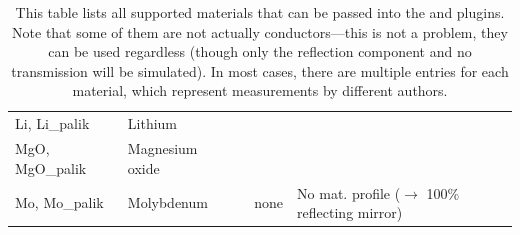 \begin{table}[hb!]
\begin{tabular}{>{\ttfamily}llp{1mm}>{\ttfamily}ll}
Li, Li\_palik         & Lithium &&                     \\
MgO, MgO\_palik       & Magnesium oxide &&             \\
Mo, Mo\_palik         & Molybdenum &&                  none & No mat. profile ($\to$ 100\% reflecting mirror)\\
\bottomrule
\end{tabular}
\caption{
    \label{tbl:conductor-iors}
     This table lists all supported materials that can be passed into the
      and  plugins. Note that
     some of them are not actually conductors---this is not a problem,
     they can be used regardless (though only the reflection component and
     no transmission will be simulated). In most cases, there are
     multiple entries for each material, which represent measurements by
     different authors.
}
\end{table}
